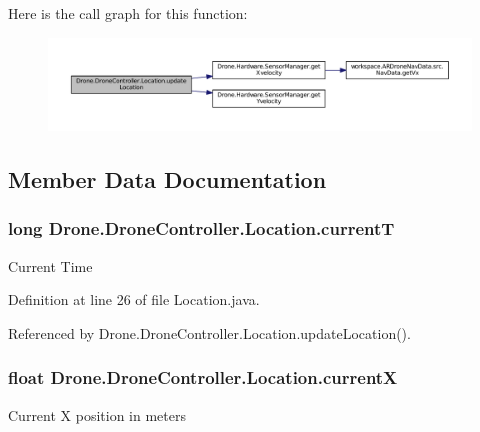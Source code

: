 Here is the call graph for this function\+:\nopagebreak
\begin{figure}[H]
\begin{center}
\leavevmode
\includegraphics[width=350pt]{class_drone_1_1_drone_controller_1_1_location_a98d3c771ad4f7635554cf31c6ca1cdab_cgraph}
\end{center}
\end{figure}




\subsection{Member Data Documentation}
\hypertarget{class_drone_1_1_drone_controller_1_1_location_a079530c9c06ca16dc9f658b88b9c44b2}{}
\subsubsection[{current\+T}]{\setlength{\rightskip}{0pt plus 5cm}long Drone.\+Drone\+Controller.\+Location.\+current\+T\hspace{0.3cm}{\ttfamily [private]}}\label{class_drone_1_1_drone_controller_1_1_location_a079530c9c06ca16dc9f658b88b9c44b2}
Current Time 

Definition at line 26 of file Location.\+java.



Referenced by Drone.\+Drone\+Controller.\+Location.\+update\+Location().

\hypertarget{class_drone_1_1_drone_controller_1_1_location_ab30780155f9666ba1585f182c2c0a220}{}
\subsubsection[{current\+X}]{\setlength{\rightskip}{0pt plus 5cm}float Drone.\+Drone\+Controller.\+Location.\+current\+X\hspace{0.3cm}{\ttfamily [private]}}\label{class_drone_1_1_drone_controller_1_1_location_ab30780155f9666ba1585f182c2c0a220}
Current X position in meters 

